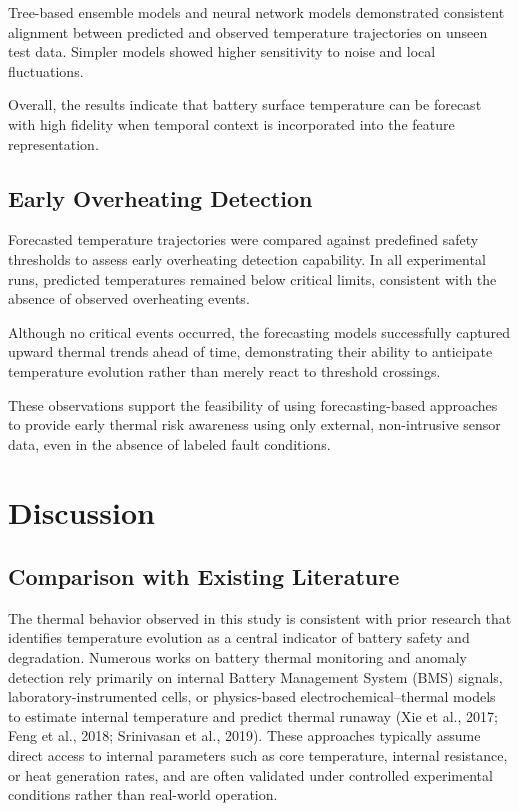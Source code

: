 \documentclass[conference]{IEEEtran}
\begin{document}
Tree-based ensemble models and neural network models demonstrated consistent alignment between predicted and observed temperature trajectories on unseen test data. Simpler models showed higher sensitivity to noise and local fluctuations.

Overall, the results indicate that battery surface temperature can be forecast with high fidelity when temporal context is incorporated into the feature representation.

\subsection{Early Overheating Detection}

Forecasted temperature trajectories were compared against predefined safety thresholds to assess early overheating detection capability. In all experimental runs, predicted temperatures remained below critical limits, consistent with the absence of observed overheating events.

Although no critical events occurred, the forecasting models successfully captured upward thermal trends ahead of time, demonstrating their ability to anticipate temperature evolution rather than merely react to threshold crossings.

These observations support the feasibility of using forecasting-based approaches to provide early thermal risk awareness using only external, non-intrusive sensor data, even in the absence of labeled fault conditions.

\section{Discussion}

\subsection{Comparison with Existing Literature}

The thermal behavior observed in this study is consistent with prior research that identifies temperature evolution as a central indicator of battery safety and degradation. Numerous works on battery thermal monitoring and anomaly detection rely primarily on internal Battery Management System (BMS) signals, laboratory-instrumented cells, or physics-based electrochemical–thermal models to estimate internal temperature and predict thermal runaway (Xie et al., 2017; Feng et al., 2018; Srinivasan et al., 2019). These approaches typically assume direct access to internal parameters such as core temperature, internal resistance, or heat generation rates, and are often validated under controlled experimental conditions rather than real-world operation.
\end{document}
